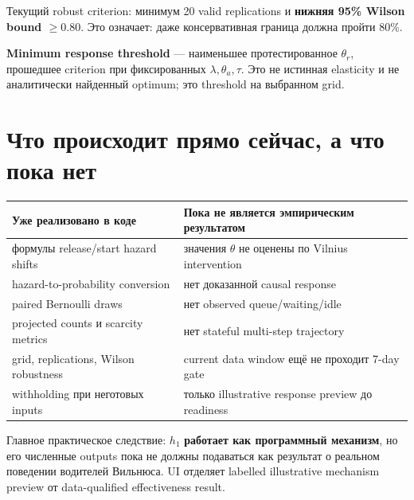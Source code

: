 \documentclass[11pt,a4paper]{article}
\begin{document}
Текущий robust criterion: минимум 20 valid replications и \textbf{нижняя 95\% Wilson bound $\ge0.80$}. Это означает: даже консервативная граница должна пройти 80\%.

\textbf{Minimum response threshold} --- наименьшее протестированное $\theta_r$, прошедшее criterion при фиксированных $\lambda,\theta_a,\tau$. Это не истинная elasticity и не аналитически найденный optimum; это threshold на выбранном grid.

\section{Что происходит прямо сейчас, а что пока нет}
\begin{tabularx}{\textwidth}{X X}
\toprule Уже реализовано в коде & Пока не является эмпирическим результатом \\\midrule
формулы release/start hazard shifts & значения $\theta$ не оценены по Vilnius intervention \\
hazard-to-probability conversion & нет доказанной causal response \\
paired Bernoulli draws & нет observed queue/waiting/idle \\
projected counts и scarcity metrics & нет stateful multi-step trajectory \\
grid, replications, Wilson robustness & current data window ещё не проходит 7-day gate \\
withholding при неготовых inputs & только illustrative response preview до readiness \\
\bottomrule
\end{tabularx}

Главное практическое следствие: $h_1$ \textbf{работает как программный механизм}, но его численные outputs пока не должны подаваться как результат о реальном поведении водителей Вильнюса. UI отделяет labelled illustrative mechanism preview от data-qualified effectiveness result.
\end{document}
